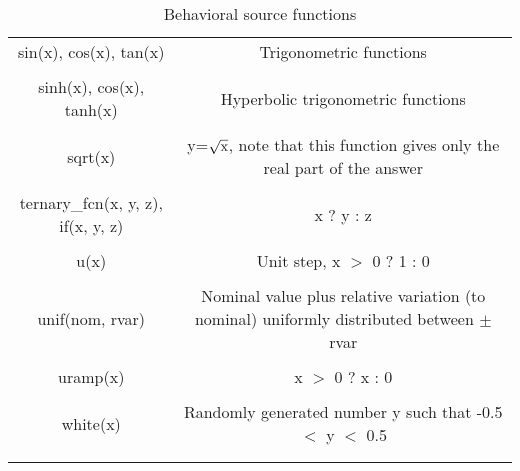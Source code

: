 \begin{longtable}{c c}
sin(x), cos(x), tan(x) & \begin{minipage}{20em}
Trigonometric functions
\end{minipage}\\ \\

sinh(x), cos(x), tanh(x) & \begin{minipage}{20em}
Hyperbolic trigonometric functions
\end{minipage}\\ \\

sqrt(x) & \begin{minipage}{20em}
y=$\sqrt{\rm{x}}$, note that this function gives only the real part of the answer
\end{minipage}\\ \\


ternary\_fcn(x, y, z), if(x, y, z) & \begin{minipage}{20em}
x ? y : z
\end{minipage}\\ \\

u(x) & \begin{minipage}{20em}
Unit step, x $>$ 0 ? 1 : 0
\end{minipage}\\ \\

unif(nom, rvar) & \begin{minipage}{20em}
Nominal value plus relative variation (to nominal) uniformly distributed between $\pm$rvar
\end{minipage}\\ \\

uramp(x) & \begin{minipage}{20em}
x $>$ 0 ? x : 0
\end{minipage}\\ \\

white(x) & \begin{minipage}{20em}
Randomly generated number y such that -0.5 $<$ y $<$ 0.5
\end{minipage}\\ \\[1ex] %
\hline %

\caption{Behavioral source functions}
\label {tab:paramfuncs}
\end{longtable}

